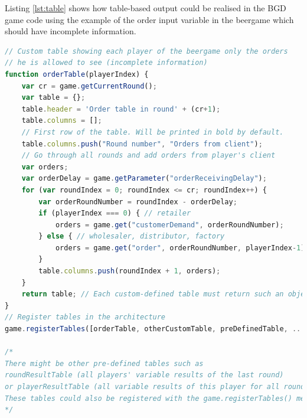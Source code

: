 Listing \ref{lst:table} shows how table-based output could be realised in the BGD game code using the example of the order input variable in the beergame which should have incomplete information.

\begin{lstlisting}[language=Javascript, caption=BGD table extension: orders in the beergame, label=lst:table,float,floatplacement=H]
// Custom table showing each player of the beergame only the orders 
// he is allowed to see (incomplete information)
function orderTable(playerIndex) {
    var cr = game.getCurrentRound();
    var table = {};
    table.header = 'Order table in round' + (cr+1);
    table.columns = [];
    // First row of the table. Will be printed in bold by default.
    table.columns.push("Round number", "Orders from client");
    // Go through all rounds and add orders from player's client
    var orders;
    var orderDelay = game.getParameter("orderReceivingDelay");
    for (var roundIndex = 0; roundIndex <= cr; roundIndex++) {
        var orderRoundNumber = roundIndex - orderDelay;
        if (playerIndex === 0) { // retailer
            orders = game.get("customerDemand", orderRoundNumber);
        } else { // wholesaler, distributor, factory
            orders = game.get("order", orderRoundNumber, playerIndex-1);
        }
        table.columns.push(roundIndex + 1, orders);
    }
    return table; // Each custom-defined table must return such an object
}
// Register tables in the architecture
game.registerTables([orderTable, otherCustomTable, preDefinedTable, ...]);

/*
There might be other pre-defined tables such as 
roundResultTable (all players' variable results of the last round)
or playerResultTable (all variable results of this player for all rounds).
These tables could also be registered with the game.registerTables() method.
*/
\end{lstlisting}
